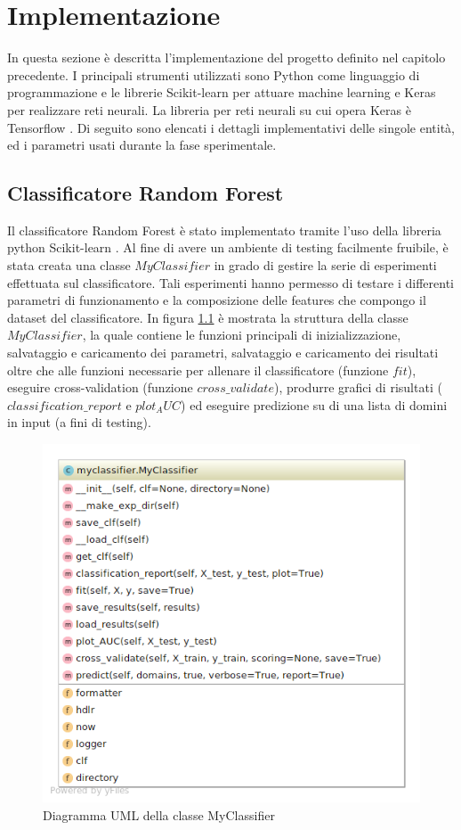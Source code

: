 \chapter{Implementazione}
\label{implementazione}
In questa sezione è descritta l'implementazione del progetto definito nel capitolo precedente. I principali strumenti utilizzati sono Python come linguaggio di programmazione e le librerie Scikit-learn \cite{sklearn} per attuare machine learning e Keras \cite{keras} per realizzare reti neurali. La libreria per reti neurali su cui opera Keras è Tensorflow \cite{tensorflow}.
Di seguito sono elencati i dettagli implementativi delle singole entità, ed i parametri usati durante la fase sperimentale.

\section{Classificatore Random Forest}
\label{imp:randomforest}
Il classificatore Random Forest è stato implementato tramite l'uso della libreria python Scikit-learn \cite{sklearn}. 
Al fine di avere un ambiente di testing facilmente fruibile, è stata creata una classe $MyClassifier$ in grado di gestire la serie di esperimenti effettuata sul classificatore. Tali esperimenti hanno permesso di testare i differenti parametri di funzionamento e la composizione delle features che compongo il dataset del classificatore. In figura \ref{fig:uml_randomforest} è mostrata la struttura della classe $MyClassifier$, la quale contiene le funzioni principali di inizializzazione, salvataggio e caricamento dei parametri, salvataggio e caricamento dei risultati oltre che alle funzioni necessarie per allenare il classificatore (funzione $fit$), eseguire cross-validation (funzione $cross\_validate$), produrre grafici di risultati ($classification\_report$ e $plot_AUC$) ed eseguire predizione su di una lista di domini in input (a fini di testing).

\begin{figure}[!htb]
	\centering
	\includegraphics[width=0.7\columnwidth]{figures/uml_randomforest.png}
	\caption{Diagramma UML della classe MyClassifier 			\label{fig:uml_randomforest}}
\end{figure}


